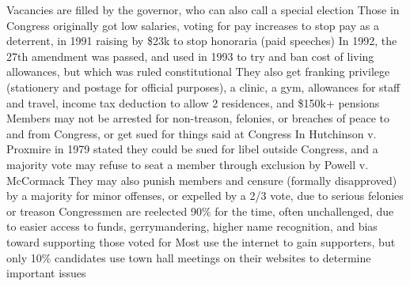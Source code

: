 \documentclass[11 pt, twoside]{article}
\newenvironment{outline*}
{
	\begin{outline}[enumerate]
	}
	{\end{outline}
}
\begin{document}
\begin{outline*}
\2 Vacancies are filled by the governor, who can also call a special election
\1 Those in Congress originally got low salaries, voting for pay increases to stop pay as a deterrent, in 1991 raising by \$23k to stop honoraria (paid speeches)
\2 In 1992, the 27th amendment was passed, and used in 1993 to try and ban cost of living allowances, but which was ruled constitutional
\2 They also get franking privilege (stationery and postage for official purposes), a clinic, a gym, allowances for staff and travel, income tax deduction to allow 2 residences, and \$150k+ pensions
\2 Members may not be arrested for non-treason, felonies, or breaches of peace to and from Congress, or get sued for things said at Congress
\2 In Hutchinson v. Proxmire in 1979 stated they could be sued for libel outside Congress, and a majority vote may refuse to seat a member through exclusion by Powell v. McCormack
\2 They may also punish members and censure (formally disapproved) by a majority for minor offenses, or expelled by a 2/3 vote, due to serious felonies or treason
\1 Congressmen are reelected 90\% for the time, often unchallenged, due to easier access to funds, gerrymandering, higher name recognition, and bias toward supporting those voted for
\2 Most use the internet to gain supporters, but only 10\% candidates use town hall meetings on their websites to determine important issues
\end{outline*}
\end{document}
